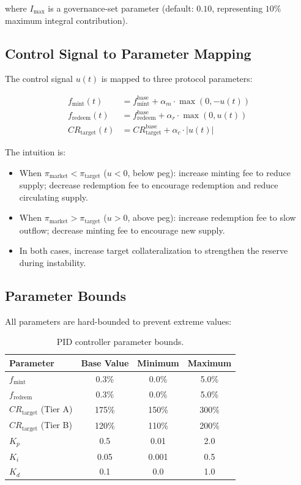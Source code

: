 \documentclass[11pt,a4paper]{article}
\newcommand{\CR}{\mathit{CR}}
\begin{document}
where $I_{\max}$ is a governance-set parameter (default: $0.10$, representing $10\%$ maximum integral contribution).

\subsection{Control Signal to Parameter Mapping}

The control signal $u(t)$ is mapped to three protocol parameters:

\begin{align}
  f_{\text{mint}}(t) &= f_{\text{mint}}^{\text{base}} + \alpha_m \cdot \max(0, -u(t)) \label{eq:fmint} \\
  f_{\text{redeem}}(t) &= f_{\text{redeem}}^{\text{base}} + \alpha_r \cdot \max(0, u(t)) \label{eq:fredeem} \\
  \CR_{\text{target}}(t) &= \CR_{\text{target}}^{\text{base}} + \alpha_c \cdot |u(t)| \label{eq:crtarget}
\end{align}

The intuition is:
\begin{itemize}
  \item When $\pi_{\text{market}} < \pi_{\text{target}}$ ($u < 0$, below peg): increase minting fee to reduce supply; decrease redemption fee to encourage redemption and reduce circulating supply.
  \item When $\pi_{\text{market}} > \pi_{\text{target}}$ ($u > 0$, above peg): increase redemption fee to slow outflow; decrease minting fee to encourage new supply.
  \item In both cases, increase target collateralization to strengthen the reserve during instability.
\end{itemize}

\subsection{Parameter Bounds}

All parameters are hard-bounded to prevent extreme values:

\begin{table}[H]
\centering
\caption{PID controller parameter bounds.}
\label{tab:pid_params}
\begin{tabular}{@{}lccc@{}}
\toprule
\textbf{Parameter} & \textbf{Base Value} & \textbf{Minimum} & \textbf{Maximum} \\
\midrule
$f_{\text{mint}}$ & 0.3\% & 0.0\% & 5.0\% \\
$f_{\text{redeem}}$ & 0.3\% & 0.0\% & 5.0\% \\
$\CR_{\text{target}}$ (Tier A) & 175\% & 150\% & 300\% \\
$\CR_{\text{target}}$ (Tier B) & 120\% & 110\% & 200\% \\
$K_p$ & 0.5 & 0.01 & 2.0 \\
$K_i$ & 0.05 & 0.001 & 0.5 \\
$K_d$ & 0.1 & 0.0 & 1.0 \\
\bottomrule
\end{tabular}
\end{table}
\end{document}
